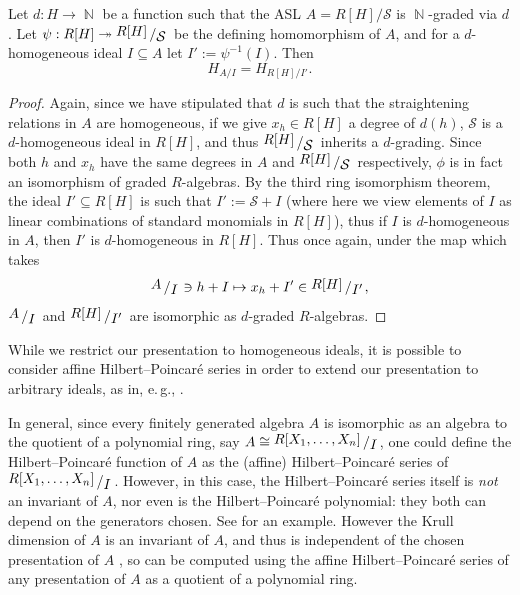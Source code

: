 \documentclass[11pt,reqno]{amsart}
\DeclareMathOperator{\N}{\mathbb{N}}
\newcommand{\bigslant}[2]{{\raisebox{.2em}{$#1$}\left/\raisebox{-.2em}{$#2$}\right.}}
\theoremstyle{definition}
\numberwithin{equation}{section}
\begin{document}
\begin{proposition} \label{prop:hilbertInPolyRing}
Let $d \colon H \to \N$ be a function such that the ASL $A = R[H]/\mathcal{S}$ is $\N$-graded via $d$. Let $\psi: R[H] \twoheadrightarrow \bigslant{R[H]}{\mathcal{S}}$ be the defining homomorphism of $A$, and for a $d$-homogeneous ideal $I \subseteq A$ let $I' := \psi^{-1}(I)$. Then \[H_{A / I} = H_{R[H] / I'}.\]
\end{proposition}

\begin{proof}
Again, since we have stipulated that $d$ is such that the straightening relations in $A$ are homogeneous, if we give $x_h \in R[H]$ a degree of $d(h)$, $\mathcal{S}$ is a $d$-homogeneous ideal in $R[H]$, and thus $\bigslant{R[H]}{\mathcal{S}}$ inherits a $d$-grading. Since both $h$ and $x_h$ have the same degrees in $A$ and $\bigslant{R[H]}{\mathcal{S}}$ respectively, $\phi$ is in fact an isomorphism of graded $R$-algebras. By the third ring isomorphism theorem, the ideal $I' \subseteq R[H]$ is such that $I' := \mathcal{S} + I$ (where here we view elements of $I$ as linear combinations of standard monomials in $R[H]$), thus if $I$ is $d$-homogeneous in $A$, then $I'$ is $d$-homogeneous in $R[H]$. Thus once again, under the map which takes \[\bigslant{A}{I} \ni h + I \mapsto x_h + I' \in \bigslant{R[H]}{I'},\] $\bigslant{A}{I}$ and $\bigslant{R[H]}{I'}$ are isomorphic as $d$-graded $R$-algebras.
\end{proof}

\begin{remark}
While we restrict our presentation to homogeneous ideals, it is possible to consider affine Hilbert--Poincar\'e series in order to extend our presentation to arbitrary ideals, as in, e.\,g., \cite[Section 5.6]{kreuzer-robbiano-2}.
\end{remark}

\begin{remark}
In general, since every finitely generated algebra $A$ is isomorphic as an algebra to the quotient of a polynomial ring, say $A \cong \bigslant{R[X_1,\dotsc,X_n]}{I}$, one could define the Hilbert--Poincar\'e function of $A$ as the (affine) Hilbert--Poincar\'e series of $\bigslant{R[X_1,\dotsc,X_n]}{I}$. However, in this case, the Hilbert--Poincar\'e series itself is \emph{not} an invariant of $A$, nor even is the Hilbert--Poincaré polynomial: they both can depend on the generators chosen. See \cite[Remark~11.3(b)]{kemper} for an example. However the Krull dimension of $A$ is an invariant of $A$, and thus is independent of the chosen presentation of $A$ \cite[Theorem~5.6.36]{kreuzer-robbiano-2}, so can be computed using the affine Hilbert--Poincaré series of any presentation of $A$ as a quotient of a polynomial ring.
\end{remark}
\end{document}
